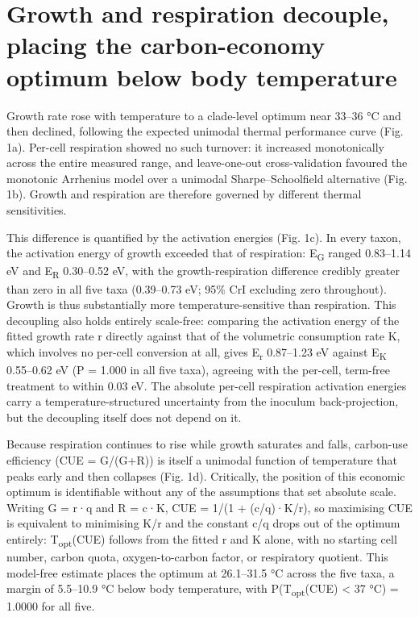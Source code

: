 \documentclass[
]{article}
\begin{document}
\section{\texorpdfstring{\textbf{Growth and respiration decouple,
placing the carbon-economy optimum below body
temperature}}{Growth and respiration decouple, placing the carbon-economy optimum below body temperature}}\label{growth-and-respiration-decouple-placing-the-carbon-economy-optimum-below-body-temperature}

Growth rate rose with temperature to a clade-level optimum near 33--36
°C and then declined, following the expected unimodal thermal
performance curve (Fig. 1a). Per-cell respiration showed no such
turnover: it increased monotonically across the entire measured range,
and leave-one-out cross-validation favoured the monotonic Arrhenius
model over a unimodal Sharpe--Schoolfield alternative (Fig. 1b). Growth
and respiration are therefore governed by different thermal
sensitivities.

This difference is quantified by the activation energies (Fig. 1c). In
every taxon, the activation energy of growth exceeded that of
respiration: E\textsubscript{G} ranged 0.83--1.14 eV and
E\textsubscript{R} 0.30--0.52 eV, with the growth-respiration difference
credibly greater than zero in all five taxa (0.39--0.73 eV; 95\% CrI
excluding zero throughout). Growth is thus substantially more
temperature-sensitive than respiration. This decoupling also holds
entirely scale-free: comparing the activation energy of the fitted
growth rate r directly against that of the volumetric consumption rate
K, which involves no per-cell conversion at all, gives
E\textsubscript{r} 0.87--1.23 eV against E\textsubscript{K} 0.55--0.62
eV (P = 1.000 in all five taxa), agreeing with the per-cell, term-free
treatment to within 0.03 eV. The absolute per-cell respiration
activation energies carry a temperature-structured uncertainty from the
inoculum back-projection, but the decoupling itself does not depend on
it.

Because respiration continues to rise while growth saturates and falls,
carbon-use efficiency (CUE = G/(G+R)) is itself a unimodal function of
temperature that peaks early and then collapses (Fig. 1d). Critically,
the position of this economic optimum is identifiable without any of the
assumptions that set absolute scale. Writing G = r·q and R = c·K, CUE =
1/(1 + (c/q)·K/r), so maximising CUE is equivalent to minimising K/r and
the constant c/q drops out of the optimum entirely:
T\textsubscript{opt}(CUE) follows from the fitted r and K alone, with no
starting cell number, carbon quota, oxygen-to-carbon factor, or
respiratory quotient. This model-free estimate places the optimum at
26.1--31.5 °C across the five taxa, a margin of 5.5--10.9 °C below body
temperature, with P(T\textsubscript{opt}(CUE) \textless{} 37 °C) =
1.0000 for all five.
\end{document}
